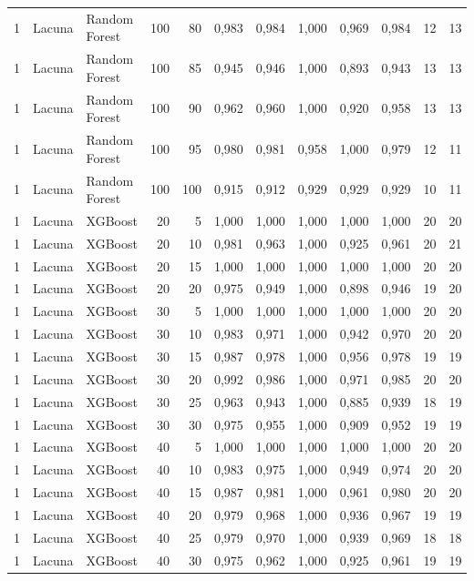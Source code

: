 \begin{longtable}{@{}rllrrrrrrrrr@{}}
1 & Lacuna & Random Forest & 100 & 80 & 0,983 & 0,984 & 1,000 & 0,969 & 0,984 & 12 & 13 \\
1 & Lacuna & Random Forest & 100 & 85 & 0,945 & 0,946 & 1,000 & 0,893 & 0,943 & 13 & 13 \\
1 & Lacuna & Random Forest & 100 & 90 & 0,962 & 0,960 & 1,000 & 0,920 & 0,958 & 13 & 13 \\
1 & Lacuna & Random Forest & 100 & 95 & 0,980 & 0,981 & 0,958 & 1,000 & 0,979 & 12 & 11 \\
1 & Lacuna & Random Forest & 100 & 100 & 0,915 & 0,912 & 0,929 & 0,929 & 0,929 & 10 & 11 \\
1 & Lacuna & XGBoost & 20 & 5 & 1,000 & 1,000 & 1,000 & 1,000 & 1,000 & 20 & 20 \\
1 & Lacuna & XGBoost & 20 & 10 & 0,981 & 0,963 & 1,000 & 0,925 & 0,961 & 20 & 21 \\
1 & Lacuna & XGBoost & 20 & 15 & 1,000 & 1,000 & 1,000 & 1,000 & 1,000 & 20 & 20 \\
1 & Lacuna & XGBoost & 20 & 20 & 0,975 & 0,949 & 1,000 & 0,898 & 0,946 & 19 & 20 \\
1 & Lacuna & XGBoost & 30 & 5 & 1,000 & 1,000 & 1,000 & 1,000 & 1,000 & 20 & 20 \\
1 & Lacuna & XGBoost & 30 & 10 & 0,983 & 0,971 & 1,000 & 0,942 & 0,970 & 20 & 20 \\
1 & Lacuna & XGBoost & 30 & 15 & 0,987 & 0,978 & 1,000 & 0,956 & 0,978 & 19 & 19 \\
1 & Lacuna & XGBoost & 30 & 20 & 0,992 & 0,986 & 1,000 & 0,971 & 0,985 & 20 & 20 \\
1 & Lacuna & XGBoost & 30 & 25 & 0,963 & 0,943 & 1,000 & 0,885 & 0,939 & 18 & 19 \\
1 & Lacuna & XGBoost & 30 & 30 & 0,975 & 0,955 & 1,000 & 0,909 & 0,952 & 19 & 19 \\
1 & Lacuna & XGBoost & 40 & 5 & 1,000 & 1,000 & 1,000 & 1,000 & 1,000 & 20 & 20 \\
1 & Lacuna & XGBoost & 40 & 10 & 0,983 & 0,975 & 1,000 & 0,949 & 0,974 & 20 & 20 \\
1 & Lacuna & XGBoost & 40 & 15 & 0,987 & 0,981 & 1,000 & 0,961 & 0,980 & 20 & 20 \\
1 & Lacuna & XGBoost & 40 & 20 & 0,979 & 0,968 & 1,000 & 0,936 & 0,967 & 19 & 19 \\
1 & Lacuna & XGBoost & 40 & 25 & 0,979 & 0,970 & 1,000 & 0,939 & 0,969 & 18 & 18 \\
1 & Lacuna & XGBoost & 40 & 30 & 0,975 & 0,962 & 1,000 & 0,925 & 0,961 & 19 & 19 \\

\end{longtable}
